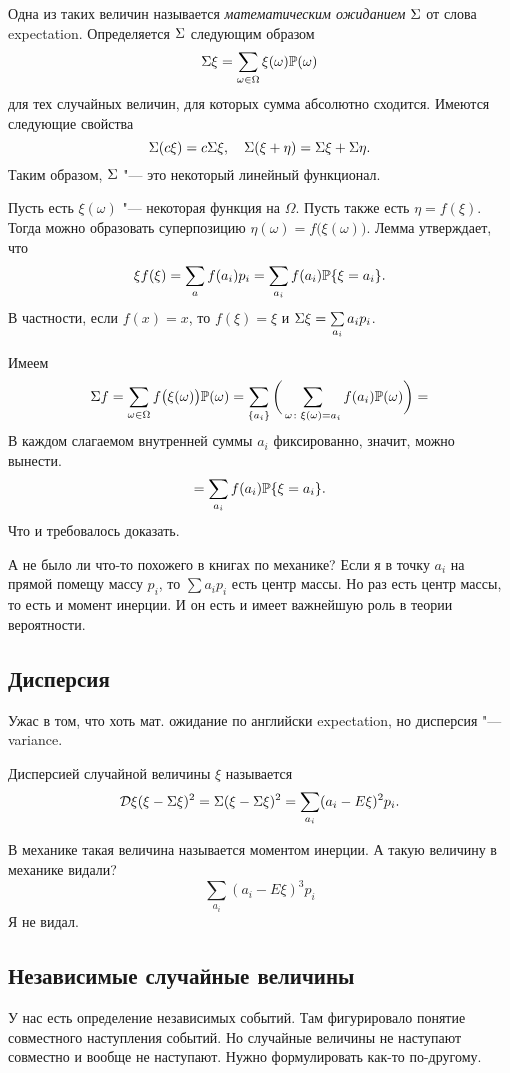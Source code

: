 Одна из таких величин называется \textit{математическим ожиданием} $\E$ от слова expectation. Определяется $\E$ следующим образом
\[
  \E\xi = \sum\limits_{\omega\in\Omega}\xi(\omega)\P(\omega)
\]
для тех случайных величин, для которых сумма абсолютно сходится. Имеются следующие свойства
\[
  \E (c\xi) = c\E\xi,\quad \E(\xi + \eta) = \E\xi + \E\eta.
\]
Таким образом, $\E$ "--- это некоторый линейный функционал.
\begin{Lem}
  Пусть есть $\xi(\omega)$ "--- некоторая функция на $\Omega$. Пусть также есть $\eta = f(\xi)$. Тогда можно образовать суперпозицию $\eta(\omega) = f\big(\xi(\omega)\big)$. Лемма утверждает, что
\[
  \xi f(\xi) = \sum\limits_a f(a_i) p_i = \sum\limits_{a_i} f(a_i) \P\{\xi = a_i\}.
\]
В частности, если $f(x) = x$, то $f(\xi) = \xi$ и $\E \xi = \sum\limits_{a_i} a_i p_i$.
\end{Lem}
\begin{Proof}
  Имеем
\[
  \E f = \sum\limits_{\omega\in\Omega} f\big(\xi(\omega)\big) \P(\omega) = 
  \sum\limits_{\{a_i\}} \bigg(\sum\limits_{\omega\colon \xi(\omega) = a_i} f(a_i)\P(\omega)\bigg) =
\]
В каждом слагаемом внутренней суммы $a_i$ фиксированно, значит, можно вынести.
\[
=\sum\limits_{a_i} f(a_i) \P\{\xi = a_i\}.
\]
Что и требовалось доказать.
\end{Proof}

А не было ли что-то похожего в книгах по механике? Если я в точку $a_i$ на прямой помещу массу $p_i$, то $\sum a_i p_i$ есть центр массы. Но раз есть центр массы, то есть и момент инерции. И он есть и имеет важнейшую роль в теории вероятности.

\subsection{Дисперсия}
Ужас в том, что хоть мат. ожидание по английски expectation, но дисперсия "--- variance.
\begin{Def}
Дисперсией случайной величины $\xi$ называется
\[
  \D\xi(\xi - \E \xi)^2 = \E (\xi - \E\xi)^2 = \sum\limits_{a_i}(a_i - E\xi)^2p_i.
\]
\end{Def}

В механике такая величина называется моментом инерции. А такую величину в механике видали?
\[
\sum\limits_{a_i}(a_i - E\xi)^3p_i
\]
Я не видал.

\subsection{Независимые случайные величины}
У нас есть определение независимых событий. Там фигурировало понятие совместного наступления событий. Но случайные величины не наступают совместно и вообще не наступают. Нужно формулировать как-то по-другому.


